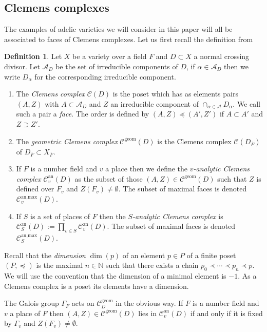 \documentclass[a4paper,11pt,reqno]{amsart}
\newcommand{\N}{\mathbb{N}}\newcommand{\Z}{\mathbb{Z}}
\theoremstyle{definition}
\newtheorem{definition}[theorem]{Definition}
\begin{document}
\subsection{Clemens complexes}
The examples of adelic varieties we will consider in this paper will all be associated to faces of Clemens complexes. Let us first recall the definition from \cite[\S3.1]{Chambert-Loir2010Igusa}
\begin{definition}
	Let $X$ be a variety over a field $F$ and $D \subset X$ a normal crossing divisor. Let $\mathcal{A}_D$ be the set of irreducible components of $D$, if $\alpha \in \mathcal{A}_D$ then we write $D_{\alpha}$ for the corresponding irreducible component.
	\begin{enumerate}
		\item The \emph{Clemens complex} $\mathcal{C}(D)$ is the poset which has as elements pairs $(A, Z)$ with $A \subset \mathcal{A}_D$ and $Z$ an irreducible component of $\cap_{\alpha \in \mathcal{A}} D_{\alpha}$. We call such a pair a \emph{face}. The order is defined by $(A, Z) \preceq (A', Z')$ if $A \subset A'$ and $Z \supset Z'$.
		
		\item The \emph{geometric Clemens complex} $\mathcal{C}^{\text{geom}}(D)$ is the Clemens complex $\mathcal{C}(D_{\overline{F}})$ of $D_{\overline{F}} \subset X_{\overline{F}}$.
		
		\item If $F$ is a number field and $v$ a place then we define the \emph{$v$-analytic Clemens complex} $\mathcal{C}_{v}^{\text{an}}(D)$ as the subset of those $(A,Z) \in \mathcal{C}^{\text{geom}}(D)$ such that $Z$ is defined over $F_v$ and $Z(F_v) \neq \emptyset$. The subset of maximal faces is denoted $\mathcal{C}_{v}^{\text{an,max}}(D)$.
		
		\item If $S$ is a set of places of $F$ then the \emph{$S$-analytic Clemens complex} is $\mathcal{C}^{\text{an}}_{S}(D) := \prod_{v \in S} \mathcal{C}_{v}^{\text{an}}(D)$. The subset of maximal faces is denoted $\mathcal{C}_{S}^{\text{an,max}}(D)$.
	\end{enumerate}
	
	Recall that the \emph{dimension} $\dim(p)$ of an element $p \in P$ of a finite poset $(P, \preceq)$ is the maximal $n \in \N$ such that there exists a chain $p_0 \prec \cdots \prec p_n \prec p$. We will use the convention that the dimension of a minimal element is $-1$. As a Clemens complex is a poset its elements have a dimension.
\end{definition}
The Galois group $\Gamma_F$ acts on $\mathcal{C}^{\text{geom}}_D$ in the obvious way. If $F$ is a number field and $v$ a place of $F$ then $(A,Z) \in \mathcal{C}^{\text{geom}}(D)$ lies in $\mathcal{C}^{\text{an}}_v(D)$ if and only if it is fixed by $\Gamma_v$ and $Z(F_v) \neq \emptyset$.
\end{document}
